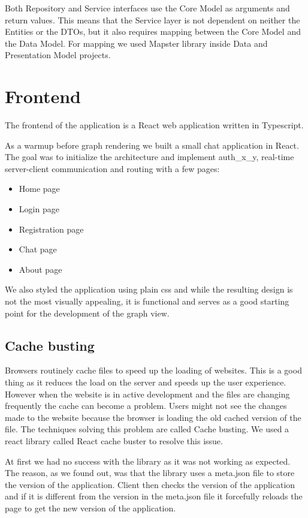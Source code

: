 Both Repository and Service interfaces use the Core Model as arguments and return values.
This means that the Service layer is not dependent on neither the Entities or the DTOs,
but it also requires mapping between the Core Model and the Data Model.
For mapping we used Mapster library inside Data and Presentation Model projects.

\section{Frontend}
The frontend of the application is a React web application written in Typescript.

As a warmup before graph rendering we built a small chat application in React.
The goal was to initialize the architecture and implement \gls{auth_x_y},
real-time server-client communication and routing with a few pages:
\begin{itemize}
    \item Home page
    \item Login page
    \item Registration page
    \item Chat page
    \item About page
\end{itemize}

We also styled the application using plain css and while the resulting design is not the most visually appealing,
it is functional and serves as a good starting point for the development of the graph view.

\subsection{Cache busting}
Browsers routinely cache files to speed up the loading of websites.
This is a good thing as it reduces the load on the server and speeds up the user experience.
However when the website is in active development and the files are changing frequently the cache can become a problem.
Users might not see the changes made to the website because the browser is loading the old cached version of the file.
The techniques solving this problem are called Cache busting. We used a react library called React cache buster to resolve this issue.

At first we had no success with the library as it was not working as expected.
The reason, as we found out, was that the library uses a meta.json file to store the version of the application.
Client then checks the version of the application and if it is different from the version in the meta.json file
it forcefully reloads the page to get the new version of the application.

